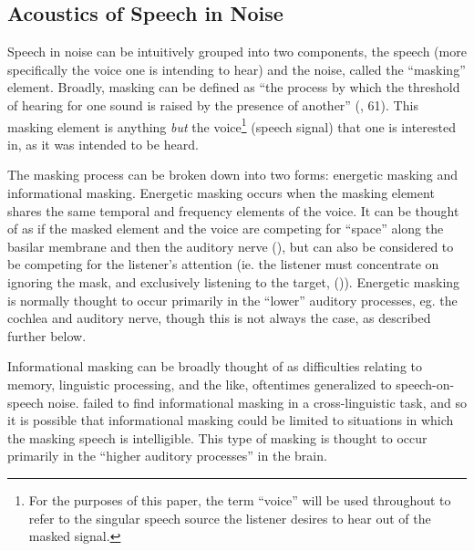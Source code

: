 \documentclass[dissertation,copyright]{uathesis}
\begin{document}
\subsection{Acoustics of Speech in Noise}
\label{bkgrnd:speech_in_noise}

Speech in noise can be intuitively grouped into two components, the speech (more specifically the voice one is intending to hear) and the noise, called the ``masking'' element.  Broadly, masking can be defined as ``the process by which the threshold of hearing for one sound is raised by the presence of another'' (\cite{ansi:13}, 61).  This masking element is anything \textit{but} the voice\footnote{For the purposes of this paper, the term ``voice'' will be used throughout to refer to the singular speech source the listener desires to hear out of the masked signal.} (speech signal) that one is interested in, as it was intended to be heard.

The masking process can be broken down into two forms: energetic masking and informational masking.  Energetic masking occurs when the masking element shares the same temporal and frequency elements of the voice.  It can be thought of as if the masked element and the voice are competing for ``space'' along the basilar membrane and then the auditory nerve (\cite{brungart:01}), but can also be considered to be competing for the listener's attention (ie. the listener must concentrate on ignoring the mask, and exclusively listening to the target, (\cite{mattys:12})).  Energetic masking is normally thought to occur primarily in the ``lower'' auditory processes, eg. the cochlea and auditory nerve, though this is not always the case, as described further below.  

Informational masking can be broadly thought of as difficulties relating to memory, linguistic processing, and the like, oftentimes generalized to speech-on-speech noise.  \cite{mattys:10} failed to find informational masking in a cross-linguistic task, and so it is possible that informational masking could be limited to situations in which the masking speech is intelligible. This type of masking is thought to occur primarily in the ``higher auditory processes'' in the brain.
\end{document}
